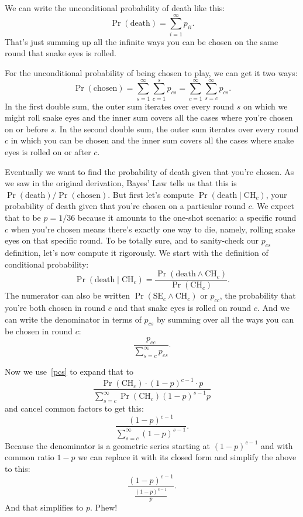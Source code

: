 \documentclass[article,twocolumn]{memoir}
\begin{document}
We can write the unconditional probability of death like this:
\begin{equation}\label{d}
\Pr(\text{death}) = \sum_{i=1}^\infty p_{ii}.
\end{equation}
That's just summing up all the infinite ways you can be chosen on the same round that snake eyes is rolled.

For the unconditional probability of being chosen to play, we can get it two ways:
\begin{equation}\label{c}
\Pr(\text{chosen}) = 
\sum_{s=1}^\infty\sum_{c=1}^s p_{cs} =
\sum_{c=1}^\infty\sum_{s=c}^\infty p_{cs}.
\end{equation}
In the first double sum, the outer sum iterates over every round $s$ on which we might roll snake eyes and the inner sum covers all the cases where you're chosen on or before $s$.
In the second double sum, the outer sum iterates over every round $c$ in which you can be chosen and the inner sum covers all the cases where snake eyes is rolled on or after $c$.

Eventually we want to find the probability of death given that you're chosen.
As we saw in the original derivation, Bayes' Law tells us that this is 
$\Pr(\text{death}) / \Pr(\text{chosen})$.
But first let's compute $\Pr(\text{death}\mid\text{CH}_c)$, your probability of death given that you're chosen on a particular round $c$.
We expect that to be $p=1/36$ because it amounts to the one-shot scenario:
a specific round $c$ when you're chosen means there's exactly one way to die, namely, rolling snake eyes on that specific round.
To be totally sure, and to sanity-check our $p_{cs}$ definition, let's now compute it rigorously.
We start with the definition of conditional probability:
$$
\Pr(\text{death}\mid\text{CH}_c) = 
\frac{\Pr(\text{death}\land\text{CH}_c)}{\Pr(\text{CH}_c)}.
$$
The numerator can also be written $\Pr(\text{SE}_c\land\text{CH}_c)$ or
$p_{cc}$, the probability that you're both chosen in round $c$ and that snake eyes is rolled on round $c$.
And we can write the denominator in terms of $p_{cs}$ by summing over all the ways you can be chosen in round $c$:
\begin{equation}\label{cc}
\frac{p_{cc}}{\sum\limits_{s=c}^\infty p_{cs}}.
\end{equation}

Now we use~\eqref{pcs} to expand that to
$$
\frac{\Pr(\text{CH}_c)\cdot(1-p)^{c-1}\cdot p}{\sum\limits_{s=c}^\infty \Pr(\text{CH}_c)(1-p)^{s-1} p}
$$
and cancel common factors to get this:
$$
\frac{(1-p)^{c-1}}{\sum\limits_{s=c}^\infty (1-p)^{s-1}}.
$$
Because the denominator is a geometric series starting at $(1-p)^{c-1}$ and with common ratio $1-p$ we can replace it with its closed form and simplify the above to this:
$$
\frac{(1-p)^{c-1}}{\frac{(1-p)^{c-1}}{p}}.
$$
And that simplifies to $p$.
Phew!
\end{document}
